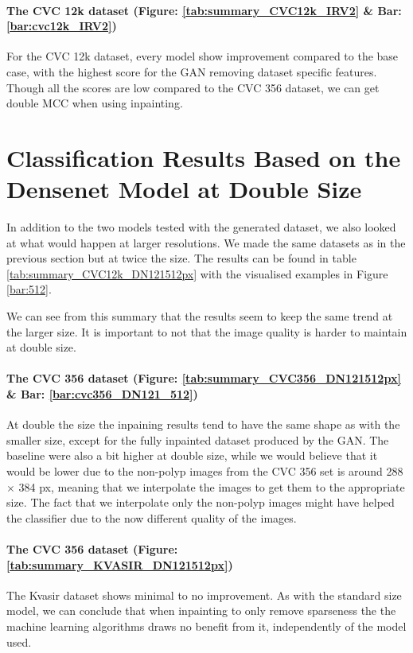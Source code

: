 \paragraph{The CVC 12k dataset (Figure: \ref{tab:summary_CVC12k_IRV2} \& Bar: \ref{bar:cvc12k_IRV2})}
For the CVC 12k dataset, every model show improvement compared to the base case, with the highest score for the GAN removing dataset specific features. Though all the scores are low compared to the CVC 356 dataset, we can get double MCC when using inpainting.



\section{Classification Results Based on the Densenet Model at Double Size}
In addition to the two models tested with the generated dataset, we also looked at what would happen at larger resolutions. We made the same datasets as in the previous section but at twice the size. The results can be found in table \ref{tab:summary_CVC12k_DN121512px} with the visualised examples in Figure \ref{bar:512}.

We can see from this summary that the results seem to keep the same trend at the larger size.
It is important to not that the image quality is harder to maintain at double size.


\paragraph{The CVC 356 dataset (Figure: \ref{tab:summary_CVC356_DN121512px} \& Bar: \ref{bar:cvc356_DN121_512})}
At double the size the inpaining results tend to have the same shape as with the smaller size, except for the fully inpainted dataset produced by the GAN.  The baseline were also a bit higher at double size, while we would believe that it would be lower due to the non-polyp images from the CVC 356 set is around 288 $\times$ 384 px, meaning that we interpolate the images to get them to the appropriate size. The fact that we interpolate only the non-polyp images might have helped the classifier due to the now different quality of the images.

\paragraph{The CVC 356 dataset (Figure: \ref{tab:summary_KVASIR_DN121512px})}
The Kvasir dataset shows minimal to no improvement. As with the standard size model, we can conclude that when inpainting to only remove sparseness the the machine learning algorithms draws no benefit from it, independently of the model used.

